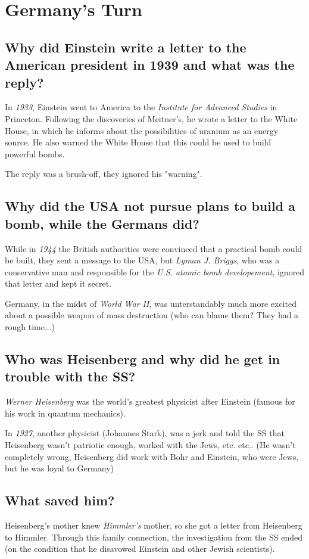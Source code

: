 %

\section{Germany's Turn}

\subsection*{Why did Einstein write a letter to the American president in 1939 and what was the
reply?}
In \emph{1933}, Einstein went to America to the \emph{Institute for Advanced Studies} in Princeton.
Following the discoveries of Meitner's, he wrote a letter to the White House, in which he informs about the possibilities of uranium as an energy source. He also warned the White House that this could be used to build powerful bombs.

The reply was a brush-off, they ignored his "warning". 

\subsection*{Why did the USA not pursue plans to build a bomb, while the Germans did?}
While in \emph{1944} the British authorities were convinced that a practical bomb could be built, they sent a message to the USA, but \emph{Lyman J. Briggs}, who was a conservative man and responsible for the \emph{U.S. atomic bomb developement}, ignored that letter and kept it secret.

Germany, in the midst of \emph{World War II}, was unterstandably much more excited about a possible weapon of mass destruction (who can blame them? They had a rough time...)

\subsection*{Who was Heisenberg and why did he get in trouble with the SS?}
\emph{Werner Heisenberg} was the world's greatest physicist after Einstein (famous for his work in quantum mechanics).

In \emph{1927}, another physicist (Johannes Stark), was a jerk and told the SS that Heisenberg wasn't patriotic enough, worked with the Jews, etc. etc.. (He wasn't completely wrong, Heisenberg did work with Bohr and Einstein, who were Jews, but he was loyal to Germany)

\subsection*{What saved him?}
Heisenberg's mother knew \emph{Himmler's} mother, so she got a letter from Heisenberg to Himmler. Through this family connection, the investigation from the SS ended (on the condition that he disavowed Einstein and other Jewish scientists).

